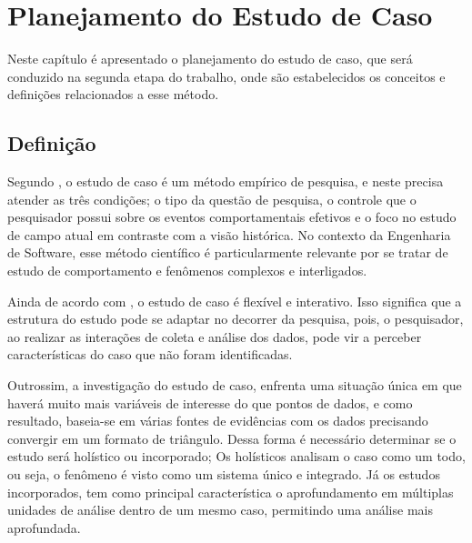 \chapter{Planejamento do Estudo de Caso}

Neste capítulo é apresentado o planejamento do estudo de caso, que será conduzido na segunda etapa do trabalho, onde são estabelecidos os conceitos e definições relacionados a esse método.

\section{Definição}

Segundo , o estudo de caso é um método empírico de pesquisa, e neste precisa atender as três condições; o tipo da questão de pesquisa, o controle que o pesquisador possui sobre os eventos comportamentais efetivos e o foco no estudo de campo atual em contraste com a visão histórica. No contexto da Engenharia de Software, esse método científico é particularmente relevante por se tratar de estudo de comportamento e fenômenos complexos e interligados.

Ainda de acordo com , o estudo de caso é flexível e interativo. Isso significa que a estrutura do estudo pode se adaptar no decorrer da pesquisa, pois, o pesquisador, ao realizar as interações de coleta e análise dos dados, pode vir a perceber características do caso que não foram identificadas.

Outrossim, a investigação do estudo de caso, enfrenta uma situação única em que haverá muito mais variáveis de interesse do que pontos de dados, e como resultado, baseia-se em várias fontes de evidências com os dados precisando convergir em um formato de triângulo. \cite{yin2001estudo} Dessa forma é necessário determinar se o estudo será holístico ou incorporado; Os holísticos analisam o caso como um todo, ou seja, o fenômeno é visto como um sistema único e integrado. Já os estudos incorporados, tem como principal característica o aprofundamento em múltiplas unidades de análise dentro de um mesmo caso, permitindo uma análise mais aprofundada.

